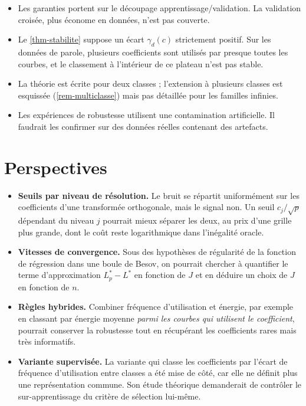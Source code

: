 \begin{itemize}
  \item Les garanties portent sur le découpage apprentissage/validation. La validation croisée, plus économe en données, n'est pas couverte.
  \item Le \cref{thm-stabilite} suppose un écart $\gamma_d(c)$ strictement positif. Sur les données de parole, plusieurs coefficients sont utilisés par presque toutes les courbes, et le classement à l'intérieur de ce plateau n'est pas stable.
  \item La théorie est écrite pour deux classes ; l'extension à plusieurs classes est esquissée (\cref{rem-multiclasse}) mais pas détaillée pour les familles infinies.
  \item Les expériences de robustesse utilisent une contamination artificielle. Il faudrait les confirmer sur des données réelles contenant des artefacts.
\end{itemize}

\section{Perspectives}

\begin{itemize}
  \item \textbf{Seuils par niveau de résolution.} Le bruit se répartit uniformément sur les coefficients d'une transformée orthogonale, mais le signal non. Un seuil $c_j/\sqrt p$ dépendant du niveau $j$ pourrait mieux séparer les deux, au prix d'une grille plus grande, dont le coût reste logarithmique dans l'inégalité oracle.
  \item \textbf{Vitesses de convergence.} Sous des hypothèses de régularité de la fonction de régression dans une boule de Besov, on pourrait chercher à quantifier le terme d'approximation $L^*_p-L^*$ en fonction de $J$ et en déduire un choix de $J$ en fonction de $n$.
  \item \textbf{Règles hybrides.} Combiner fréquence d'utilisation et énergie, par exemple en classant par énergie moyenne \emph{parmi les courbes qui utilisent le coefficient}, pourrait conserver la robustesse tout en récupérant les coefficients rares mais très informatifs.
  \item \textbf{Variante supervisée.} La variante qui classe les coefficients par l'écart de fréquence d'utilisation entre classes a été mise de côté, car elle ne définit plus une représentation commune. Son étude théorique demanderait de contrôler le sur-apprentissage du critère de sélection lui-même.
\end{itemize}
